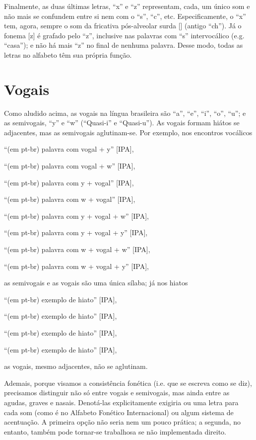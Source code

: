 \documentclass[12pt, a5paper, titlepage]{article}
\begin{document}
\begin{bilingualpages}
    Finalmente, as duas últimas letras, ``x'' e ``z'' representam, cada, um único
    som e não mais se confundem entre si nem com o ``s'', ``c'', etc.
    Especificamente, o ``x'' tem, agora, sempre o som da fricativa pós-alveolar
    surda [\textesh] (antigo ``ch''). Já o fonema [z] é grafado pelo ``z'',
    inclusive nas palavras com ``s'' intervocálico (e.g. ``casa''); e não há mais
    ``z'' no final de nenhuma palavra. Desse modo, todas as letras no alfabeto têm
    sua própria função.

    \section{Vogais}
    Como aludido acima, as vogais na língua brasileira são ``a'', ``e'', ``i'',
    ``o'', ``u''; e as semivogais, ``y'' e ``w'' (``Quasi-i'' e ``Quasi-u''). As
    vogais formam hiátos se adjacentes, mas as semivogais aglutinam-se. Por exemplo, nos encontros vocálicos
    \newline
    \par ``(em pt-br) palavra com vogal + y'' {[IPA]},
    \par ``(em pt-br) palavra com vogal + w'' {[IPA]},
    \par ``(em pt-br) palavra com y + vogal'' {[IPA]},
    \par ``(em pt-br) palavra com w + vogal'' {[IPA]},
    \par ``(em pt-br) palavra com y + vogal + w'' {[IPA]},
    \par ``(em pt-br) palavra com y + vogal + y'' {[IPA]},
    \par ``(em pt-br) palavra com w + vogal + w'' {[IPA]},
    \par ``(em pt-br) palavra com w + vogal + y'' {[IPA]},
    \newline

    as semivogais e as vogais são uma única sílaba; já nos hiatos
    \newline
    \par ``(em pt-br) exemplo de hiato'' [IPA],
    \par ``(em pt-br) exemplo de hiato'' [IPA],
    \par ``(em pt-br) exemplo de hiato'' [IPA],
    \par ``(em pt-br) exemplo de hiato'' [IPA],
    \newline

    as vogais, mesmo adjacentes, não se aglutinam.

    Ademais, porque visamos a consistência fonética (i.e. que se escreva como se
    diz), precisamos distinguir não só entre vogais e semivogais, mas ainda entre
    as agudas, graves e nasais. Denotá-las explicitamente exigiria ou uma letra
    para cada som (como é no Alfabeto Fonético Internacional) ou algum sistema de
    acentuação. A primeira opção não seria nem um pouco prática; a segunda, no
    entanto, também pode tornar-se trabalhosa se não implementada direito.


\end{bilingualpages}
\end{document}
